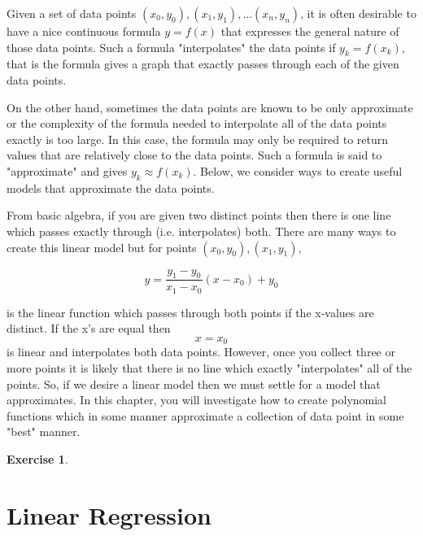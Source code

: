 \documentclass[10pt,]{book}
\theoremstyle{plain}
\theoremstyle{definition}
\theoremstyle{definition}
\theoremstyle{definition}
\newtheorem{exercise}[theorem]{Exercise}
\numberwithin{equation}{section}
\begin{document}
Given a set of data points \((x_0,y_0), (x_1,y_1), ... (x_n,y_n)\), it is often desirable to have a nice continuous formula \(y = f(x)\) that expresses the general nature of those data points. Such a formula "interpolates" the data points if \(y_k = f(x_k)\), that is the formula gives a graph that exactly passes through each of the given data points.%
\par

On the other hand, sometimes the data points are known to be only approximate or the complexity of the formula needed to interpolate all of the data points exactly is too large. In this case, the formula may only be required to return values that are relatively close to the data points. Such a formula is said to "approximate" and gives \(y_k \approx f(x_k)\). Below, we consider ways to create useful models that approximate the data points.
%
\par

From basic algebra, if you are given two distinct points then there is one line which passes exactly through (i.e. interpolates) both. There are many ways to create this linear model but for points \((x_0,y_0), (x_1,y_1)\),

\begin{equation*} y = \frac{y_1 - y_0}{x_1 - x_0}(x - x_0) + y_0\end{equation*}

is the linear function which passes through both points if the x-values are distinct.  If the x's are equal then 
\begin{equation*} x = x_0\end{equation*}
is linear and interpolates both data points. 
However, once you collect three or more points it is likely that there is no line which exactly "interpolates" all of the points. So, if we desire a linear model then we must settle for a model that approximates. In this chapter, you will investigate how to create polynomial functions which in some manner approximate a collection of data point in some "best" manner.
%
\begin{exercise}\label{exercise-5}
\end{exercise}
\typeout{************************************************}
\typeout{************************************************}
\section[{Linear Regression}]{Linear Regression}\label{section-11}
\end{document}
